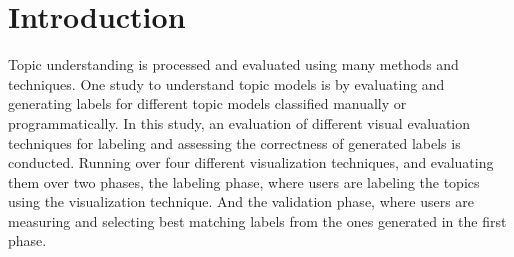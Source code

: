 \section{Introduction}
\label{sec:intro}

Topic understanding is processed and evaluated using many methods and techniques. One study to understand topic models is by evaluating and
generating labels for different topic models classified manually or programmatically. In this study, an evaluation of different visual evaluation techniques
for labeling and assessing the correctness of generated labels is conducted. Running over four different visualization techniques, and evaluating them
over two phases, the labeling phase, where users are labeling the topics using the visualization technique. And the validation phase, where users are
measuring and selecting best matching labels from the ones generated in the first phase.
